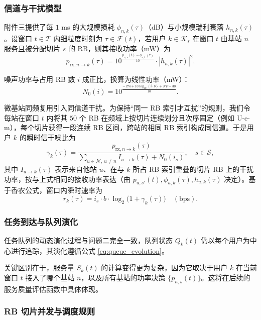 \subsubsection{信道与干扰模型}

附件三提供了每 $1$ ms 的大规模损耗 $\phi_{n,k}(\tau)$（dB）与小规模瑞利衰落 $h_{n,k}(\tau)$。设窗口 $t\in\mathcal{T}$ 内细粒度时刻为 $\tau\in\mathcal{F}(t)$，若用户 $k\in\mathcal{K}_s$ 在窗口 $t$ 由基站 $n$ 服务且被分配切片 $s$ 的 RB，则其接收功率（mW）为
\begin{equation}
 p_{\mathrm{rx},n\to k}(\tau)=10^{\frac{p_{n,s}(t)-\phi_{n,k}(\tau)}{10}}\cdot |h_{n,k}(\tau)|^2.
\end{equation}

噪声功率与占用 RB 数 $i$ 成正比，换算为线性功率（mW）：
\begin{equation}
 N_0(i)=10^{\frac{-174+10\log_{10}(i\cdot b)+NF-30}{10}}.
\end{equation}

微基站同频复用引入同信道干扰。为保持“同一 RB 索引才互扰”的规则，我们令每站在窗口 $t$ 内将其 $50$ 个 RB 在频域上按切片连续划分且次序固定（例如 U-e-m），每个切片获得一段连续 RB 区间，跨站的相同 RB 索引构成同信道。于是用户 $k$ 的瞬时信干噪比为
\begin{equation}
 \gamma_k(\tau)=\frac{p_{\mathrm{rx},n\to k}(\tau)}{\sum\limits_{u\in\mathcal{N},\ u\neq n} I_{u\to k}(\tau)+N_0(i_s)},\quad s\in\mathcal{S},
\end{equation}
其中 $I_{u\to k}(\tau)$ 表示来自他站 $u$、在与 $k$ 所占 RB 索引重叠的切片 RB 上的干扰功率，按与上式相同的接收功率表达（由 $p_{u,s'}(t),\phi_{u,k}(\tau),h_{u,k}(\tau)$ 决定）。基于香农公式，窗口内瞬时速率为
\begin{equation}
 r_k(\tau)=i_s\cdot b\cdot \log_2\big(1+\gamma_k(\tau)\big)\quad(\mathrm{bps}).
\end{equation}
\subsubsection{任务到达与队列演化}

任务队列的动态演化过程与问题二完全一致，队列状态 $Q_k(t)$ 仍以每个用户为中心进行追踪，其演化遵循公式 \eqref{eq:queue_evolution}。

关键区别在于，服务量 $S_k(t)$ 的计算变得更为复杂，因为它取决于用户 $k$ 在当前窗口 $t$ 接入了哪个基站 $n$，以及所有基站的功率决策 $\{p_{n,s}(t)\}$。这将在后续的服务质量评估函数中具体体现。


\subsubsection{RB 切片并发与调度规则}

